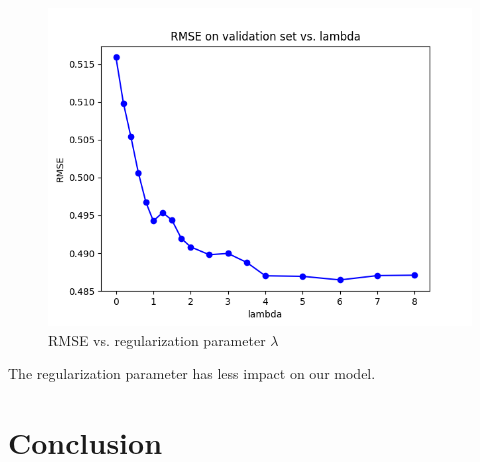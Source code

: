 \documentclass[DIV=14,twocolumn]{scrartcl}
\begin{document}
\begin{figure}[h]
	\includegraphics[width=\columnwidth]{../img/lambda-rmse-validate}
	\caption{RMSE vs. regularization parameter $\lambda$}
	\label{fig:lambdasearch}
\end{figure}

The regularization parameter has less impact on our model. 
\section{Conclusion}
{}

\end{document}

